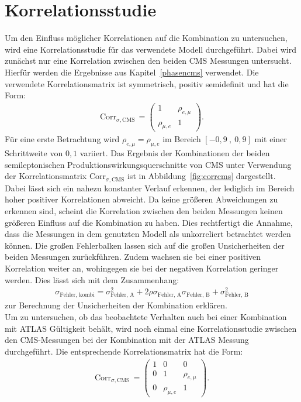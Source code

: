 \section{Korrelationsstudie}
Um den Einfluss möglicher Korrelationen auf die Kombination zu untersuchen, wird eine Korrelationsstudie für das verwendete Modell durchgeführt.
Dabei wird zunächst nur eine Korrelation zwischen den beiden CMS Messungen untersucht.
Hierfür werden die Ergebnisse aus Kapitel~\ref{phasencms} verwendet.
Die verwendete Korrelationsmatrix ist symmetrisch, positiv semidefinit und hat die Form:
\begin{align}
  \text{Corr}_{\sigma,\text{CMS}}\,=\begin{pmatrix}
  1 & \rho_{e, \mu}\\
  \rho_{\mu, e} & 1
  \end{pmatrix}.
  \label{eqn:matrix1}
\end{align}
Für eine erste Betrachtung wird $\rho_{e, \mu}= \rho_{\mu, e}$ im Bereich $[-0,9~,~0,9]$ mit einer Schrittweite von $0,1$ variiert.
Das Ergebnis der Kombinationen der beiden semileptonischen Produktionswirkungsquerschnitte von CMS unter Verwendung der Korrelationsmatrix $\text{Corr}_{\sigma,\text{CMS}}$ ist in Abbildung~\ref{fig:corrcms} dargestellt.
Dabei lässt sich ein nahezu konstanter Verlauf erkennen, der lediglich im Bereich hoher positiver Korrelationen abweicht.
Da keine größeren Abweichungen zu erkennen sind, scheint die Korrelation zwischen den beiden Messungen keinen größeren Einfluss auf die Kombination zu haben.
Dies rechtfertigt die Annahme, dass die Messungen in dem genutzten Modell als unkorreliert betrachtet werden können. Die großen Fehlerbalken lassen sich auf die großen Unsicherheiten der beiden Messungen zurückführen. Zudem wachsen sie bei einer positiven Korrelation weiter an, wohingegen sie bei der negativen Korrelation geringer werden. Dies lässt sich mit dem Zusammenhang:
\begin{align}
  \sigma_{\text{Fehler, kombi}} = \sigma_{\text{Fehler, A}}^2 + 2\rho\sigma_{\text{Fehler, A}}\sigma_{\text{Fehler, B}} + \sigma_{\text{Fehler, B}}^2
\end{align}
zur Berechnung der Unsicherheiten der Kombination erklären.\\
Um zu untersuchen, ob das beobachtete Verhalten auch bei einer Kombination mit ATLAS Gültigkeit behält, wird noch einmal eine Korrelationsstudie zwischen den CMS-Messungen bei der Kombination mit der ATLAS Messung durchgeführt. Die entsprechende Korrelationsmatrix hat die Form:
\begin{align}
  \text{Corr}_{\sigma,\text{CMS}}\,=\begin{pmatrix}
  1 & 0 & 0\\
  0 & 1 &\rho_{e, \mu}\\
  0 & \rho_{\mu, e} & 1
  \end{pmatrix}.
  \label{eqn:matrix2}
\end{align}
